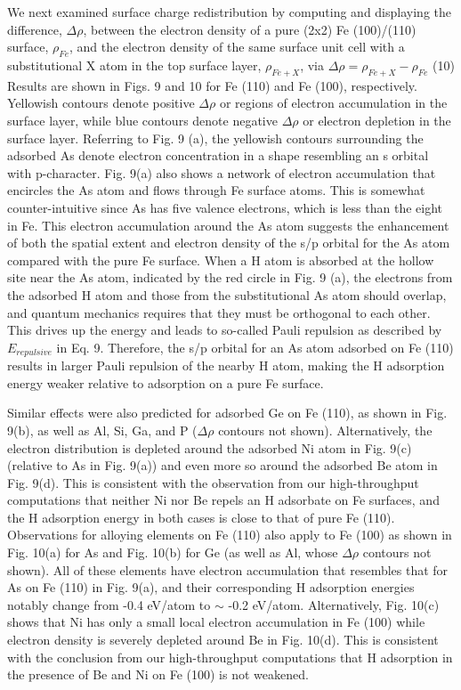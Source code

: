 We next examined surface charge redistribution by computing and displaying the difference, $\Delta \rho$, between the electron density of a pure (2x2) Fe (100)/(110) surface, $\rho_{Fe}$, and the electron density of the same surface unit cell with a substitutional X atom in the top surface layer, $\rho_{Fe+X}$, via
$\Delta \rho = \rho_{Fe+ X} - \rho_{Fe}$          	                  	                	(10)                                   
Results are shown in Figs. 9 and 10 for Fe (110) and Fe (100), respectively. Yellowish contours denote positive $\Delta \rho$ or regions of electron accumulation in the surface layer, while blue contours denote negative $\Delta \rho$ or electron depletion in the surface layer. Referring to Fig. 9 (a), the yellowish contours surrounding the adsorbed As denote electron concentration in a shape resembling an s orbital with p-character. Fig. 9(a) also shows a network of electron accumulation that encircles the As atom and flows through Fe surface atoms. This is somewhat counter-intuitive since As has five valence electrons, which is less than the eight in Fe. This electron accumulation around the As atom suggests the enhancement of both the spatial extent and electron density of the s/p orbital for the As atom compared with the pure Fe surface. When a H atom is absorbed at the hollow site near the As atom, indicated by the red circle in Fig. 9 (a), the electrons from the adsorbed H atom and those from the substitutional As atom should overlap, and quantum mechanics requires that they must be orthogonal to each other. This drives up the energy and leads to so-called Pauli repulsion as described by $E_{repulsive}$ in Eq. 9. Therefore, the s/p orbital for an As atom adsorbed on Fe (110) results in larger Pauli repulsion of the nearby H atom, making the H adsorption energy weaker relative to adsorption on a pure Fe surface. 

Similar effects were also predicted for adsorbed Ge on Fe (110), as shown in Fig. 9(b), as well as Al, Si, Ga, and P ($\Delta \rho$ contours not shown). Alternatively, the electron distribution is depleted around the adsorbed Ni atom in Fig. 9(c) (relative to As in Fig. 9(a)) and even more so around the adsorbed Be atom in Fig. 9(d). This is consistent with the observation from our high-throughput computations that neither Ni nor Be repels an H adsorbate on Fe surfaces, and the H adsorption energy in both cases is close to that of pure Fe (110). Observations for alloying elements on Fe (110) also apply to Fe (100) as shown in Fig. 10(a) for As and Fig. 10(b) for Ge (as well as Al, whose $\Delta \rho$ contours not shown). All of these elements have electron accumulation that resembles that for As on Fe (110) in Fig. 9(a), and their corresponding H adsorption energies notably change from -0.4 eV/atom to $\sim$ -0.2 eV/atom. Alternatively, Fig. 10(c) shows that Ni has only a small local electron accumulation in Fe (100) while electron density is severely depleted around Be in Fig. 10(d). This is consistent with the conclusion from our high-throughput computations that H adsorption in the presence of Be and Ni on Fe (100) is not weakened.

